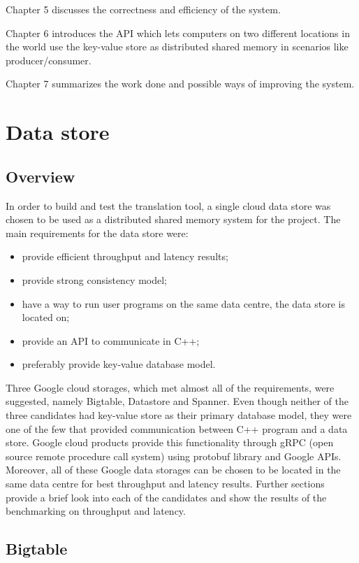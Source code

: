 \documentclass[bsc,frontabs,twoside,singlespacing,parskip,deptreport]{infthesis}     %
\begin{document}
Chapter 5 discusses the correctness and efficiency of the system. 

Chapter 6 introduces the API which lets computers on two different locations in the world use the key-value store as distributed shared memory in scenarios like producer/consumer.

Chapter 7 summarizes the work done and possible ways of improving the system.

\chapter{Data store}

\section{Overview}

In order to build and test the translation tool, a single cloud data store was chosen to be used as a distributed shared memory system for the project. The main requirements for the data store were:

\begin{itemize}
\item
provide efficient throughput and latency results;
\item
provide strong consistency model;
\item
have a way to run user programs on the same data centre, the data store is located on;
\item
provide an API to communicate in C++;
\item
preferably provide key-value database model.
\end{itemize}

Three Google cloud storages, which met almost all of the requirements, were suggested, namely Bigtable, Datastore and Spanner. Even though neither of the three candidates had key-value store as their primary database model, they were one of the few that provided communication between C++ program and a data store. Google cloud products provide this functionality through gRPC (open source remote procedure call system) using protobuf library and Google APIs. Moreover, all of these Google data storages can be chosen to be located in the same data centre for best throughput and latency results. Further sections provide a brief look into each of the candidates and show the results of the benchmarking on throughput and latency.

\section{Bigtable}
\end{document}
